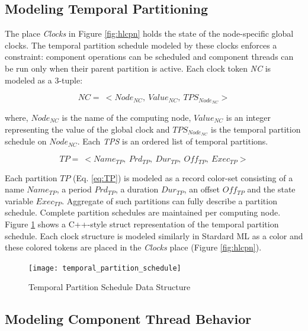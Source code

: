 \subsection{Modeling Temporal Partitioning}
The place \emph{Clocks} in Figure \ref{fig:hlcpn} holds the state of the node-specific global clocks. The temporal partition schedule modeled by these clocks enforces a constraint: component operations can be scheduled and component threads can be run only when their parent partition is active. Each clock token \emph{NC} is modeled as a 3-tuple:

\vspace{-0.15in}
\begin{equation}
\label{eq:NC}
NC = \ < Node_{NC}, \ Value_{NC}, \ TPS_{Node_{NC}} >
\end{equation}

where, $Node_{NC}$ is the name of the computing node, $Value_{NC}$ is an integer representing the value of the global clock and $TPS_{Node_{NC}}$ is the temporal partition schedule on $Node_{NC}$. Each \emph{TPS} is an ordered list of temporal partitions.

\vspace{-0.15in}
\begin{equation}
\label{eq:TP}
TP = \ < Name_{TP}, \ Prd_{TP}, \ Dur_{TP}, \ Off_{TP}, \ Exec_{TP} >
\end{equation}

Each partition $TP$ (Eq. \ref{eq:TP}) is modeled as a record color-set consisting of a name $Name_{TP}$, a period $Prd_{TP}$, a duration $Dur_{TP}$, an offset $Off_{TP}$ and the state variable  $Exec_{TP}$. Aggregate of such partitions can fully describe a partition schedule. Complete partition schedules are maintained per computing node. Figure \ref{fig:tps_dt} shows a C++-style struct representation of the temporal partition schedule. Each clock structure is modeled similarly in Stardard ML as a color and these colored tokens are placed in the \emph{Clocks} place (Figure \ref{fig:hlcpn}). 

\begin{figure}[h]
	\centering
	\texttt{[image: temporal\_partition\_schedule]}
	\caption{Temporal Partition Schedule Data Structure}
	\label{fig:tps_dt}
\end{figure}

\subsection{Modeling Component Thread Behavior}

